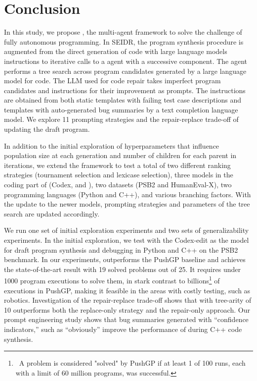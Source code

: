\section{Conclusion}
\label{sec:seidr-conclusion}

In this study, we propose \method{}, the multi-agent framework to solve the challenge of fully autonomous programming. 
In SEIDR, the program synthesis procedure is augmented from the direct generation of code with large language models instructions to iterative calls to a \debug{} agent with a successive \rank{} component. 
The \debug{} agent performs a tree search across program candidates generated by a large language model for code.
The LLM used for code repair takes imperfect program candidates and instructions for their improvement as prompts. 
The instructions are obtained from both static templates with failing test case descriptions and templates with auto-generated bug summaries by a text completion language model. 
We explore 11 prompting strategies and the repair-replace trade-off of updating the draft program.

In addition to the initial exploration of hyperparameters that influence population size at each generation and number of children for each parent in \method{} iterations, we extend the framework to test a total of two different ranking strategies (tournament selection and lexicase selection), three models in the coding part of \method{} (Codex, \gpt{} and \llama{}), two datasets (PSB2 and HumanEval-X), two programming languages (Python and C++), and various branching factors. 
With the update to the newer models, prompting strategies and parameters of the tree search are updated accordingly. 

We run one set of initial exploration experiments and two sets of generalizability experiments. 
In the initial exploration, we test \method{} with the Codex-edit as the model for draft program synthesis and debugging in Python and C++ on the PSB2 benchmark. 
In our experiments, \method{} outperforms the PushGP baseline and achieves the state-of-the-art result with 19 solved problems out of 25. 
It requires under 1000 program executions to solve them, in stark contrast to billions\footnote{~A problem is considered "solved" by PushGP if at least 1 of 100 runs, each with a limit of 60 million programs, was successful.} of executions in PushGP, making it feasible in the areas with costly testing, such as robotics.
Investigation of the repair-replace trade-off shows that \method{} with tree-arity of 10 outperforms both the replace-only strategy and the repair-only approach. 
Our prompt engineering study shows that bug summaries generated with ``confidence indicators,'' such as ``obviously'' improve the performance of \method{} during C++ code synthesis. 

